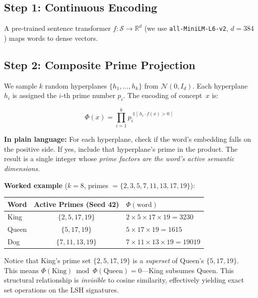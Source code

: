 \documentclass[10pt]{article}
\begin{document}
\subsection{Step 1: Continuous Encoding}

A pre-trained sentence transformer $f\!: \mathcal{S} \to \mathbb{R}^d$ (we use \texttt{all-MiniLM-L6-v2}, $d\!=\!384$) maps words to dense vectors.

\subsection{Step 2: Composite Prime Projection}

We sample $k$ random hyperplanes $\{h_1,\ldots,h_k\}$ from $\mathcal{N}(0, I_d)$. Each hyperplane~$h_i$ is assigned the $i$-th prime number $p_i$. The encoding of concept~$x$ is:

\begin{equation}
\boxed{\;\Phi(x) = \prod_{i=1}^{k} p_i^{\;\mathbb{1}[\,h_i \cdot f(x) > 0\,]}\;}
\label{eq:encoding}
\end{equation}

\noindent\textbf{In plain language:} For each hyperplane, check if the word's embedding falls on the positive side. If yes, include that hyperplane's prime in the product. The result is a single integer whose \emph{prime factors are the word's active semantic dimensions}.

\smallskip
\noindent\textbf{Worked example} ($k=8$, primes $= \{2,3,5,7,11,13,17,19\}$):

\smallskip
\begin{center}
\small
\begin{tabular}{lcl}
\toprule
Word & Active Primes (Seed 42) & $\Phi(\text{word})$ \\
\midrule
King & $\{2, 5, 17, 19\}$ & $2 \times 5 \times 17 \times 19 = 3230$ \\
Queen & $\{5, 17, 19\}$ & $5 \times 17 \times 19 = 1615$ \\
Dog & $\{7, 11, 13, 19\}$ & $7 \times 11 \times 13 \times 19 = 19019$ \\
\bottomrule
\end{tabular}
\end{center}

\smallskip
\noindent Notice that King's prime set $\{2,5,17,19\}$ is a \emph{superset} of Queen's $\{5,17,19\}$. This means $\Phi(\text{King}) \bmod \Phi(\text{Queen}) = 0$---King subsumes Queen. This structural relationship is \emph{invisible} to cosine similarity, effectively yielding exact set operations on the LSH signatures.
\end{document}
